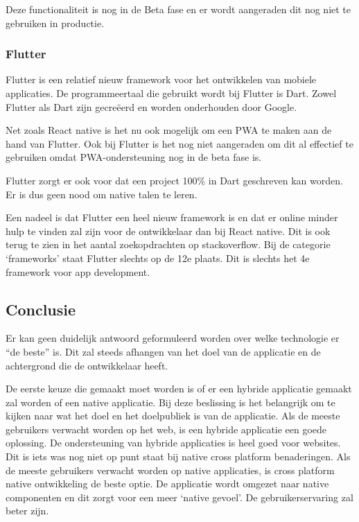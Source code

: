 			Deze functionaliteit is nog in de Beta fase en er wordt aangeraden dit nog niet te gebruiken in productie.
			
			\autocite{Expo2020}


	\subsubsection{Flutter}
		Flutter \autocite{Flutter2020} is een relatief nieuw framework voor het ontwikkelen van mobiele applicaties. De programmeertaal die gebruikt wordt bij Flutter is Dart. Zowel Flutter als Dart zijn gecreëerd en worden onderhouden door Google. 
		
		Net zoals React native is het nu ook mogelijk om een PWA te maken aan de hand van Flutter. Ook bij Flutter is het nog niet aangeraden om dit al effectief te gebruiken omdat PWA-ondersteuning nog in de beta fase is. 
		
		Flutter zorgt er ook voor dat een project 100\% in Dart geschreven kan worden. Er is dus geen nood om native talen te leren. 
		
		Een nadeel is dat Flutter een heel nieuw framework is en dat er online minder hulp te vinden zal zijn voor de ontwikkelaar dan bij React native. Dit is ook terug te zien in het aantal zoekopdrachten op stackoverflow. Bij de categorie ‘frameworks’ staat Flutter slechts op de 12e plaats. Dit is slechts het 4e framework voor app development.
		\autocite{StackOverflow2020}
		
\subsection{Conclusie}

Er kan geen duidelijk antwoord geformuleerd worden over welke technologie er “de beste” is. Dit zal steeds afhangen van het doel van de applicatie en de achtergrond die de ontwikkelaar heeft.

De eerste keuze die gemaakt moet worden is of er een hybride applicatie gemaakt zal worden of een native applicatie. Bij deze beslissing is het belangrijk om te kijken naar wat het doel en het doelpubliek is van de applicatie. Als de meeste gebruikers verwacht worden op het web, is een hybride applicatie een goede oplossing. De ondersteuning van hybride applicaties is heel goed voor websites. Dit is iets was nog niet op punt staat bij native cross platform benaderingen. Als de meeste gebruikers verwacht worden op native applicaties, is cross platform native ontwikkeling de beste optie. De applicatie wordt omgezet naar native componenten en dit zorgt voor een meer ‘native gevoel’. De gebruikerservaring zal beter zijn.


